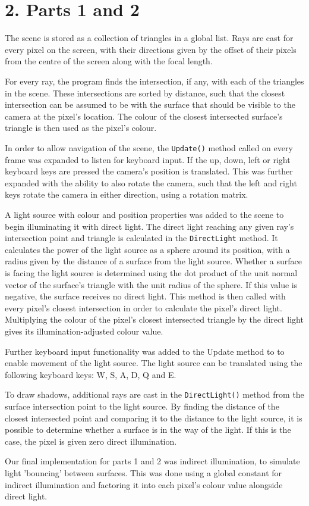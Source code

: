 \documentclass[DIV=calc, paper=a4, fontsize=11pt, twocolumn]{article}	 %
\begin{document}
	\section*{2. Parts 1 and 2}
	The scene is stored as a collection of triangles in a global list. Rays are cast for every pixel on the screen, with their directions given by the offset of their pixels from the centre of the screen along with the focal length. \par
	For every ray, the program finds the intersection, if any, with each of the triangles in the scene. These intersections are sorted by distance, such that the closest intersection can be assumed to be with the surface that should be visible to the camera at the pixel's location. The colour of the closest intersected surface's triangle is then used as the pixel's colour. \par
	In order to allow navigation of the scene, the \texttt{Update()} method called on every frame was expanded to listen for keyboard input. If the up, down, left or right keyboard keys are pressed the camera's position is translated. This was further expanded with the ability to also rotate the camera, such that the left and right keys rotate the camera in either direction, using a rotation matrix. \par
	A light source with colour and position properties was added to the scene to begin illuminating it with direct light. The direct light reaching any given ray's intersection point and triangle is calculated in the \texttt{DirectLight} method. It calculates the power of the light source as a sphere around its position, with a radius given by the distance of a surface from the light source. Whether a surface is facing the light source is determined using the dot product of the unit normal vector of the surface's triangle with the unit radius of the sphere. If this value is negative, the surface receives no direct light. This method is then called with every pixel's closest intersection in order to calculate the pixel's direct light. Multiplying the colour of the pixel's closest intersected triangle by the direct light gives its illumination-adjusted colour value. \par
	Further keyboard input functionality was added to the Update method to to enable movement of the light source. The light source can be translated using the following keyboard keys: W, S, A, D, Q and E. \par
	To draw shadows, additional rays are cast in the \texttt{DirectLight()} method from the surface intersection point to the light source. By finding the distance of the closest intersected point and comparing it to the distance to the light source, it is possible to determine whether a surface is in the way of the light. If this is the case, the pixel is given zero direct illumination. \par
	Our final implementation for parts 1 and 2 was indirect illumination, to simulate light 'bouncing' between surfaces. This was done using a global constant for indirect illumination and factoring it into each pixel's colour value alongside direct light. 
		
\end{document}
